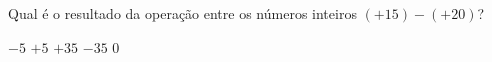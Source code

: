 Qual é o resultado da operação entre os números inteiros $(+15) - (+20)$?

$-5$
$+5$
$+35$
$-35$
$0$




